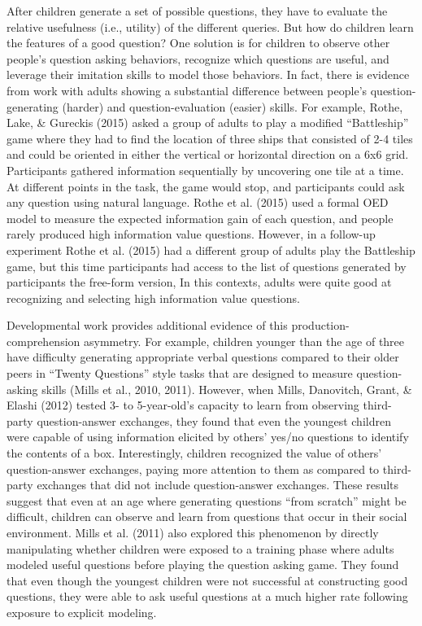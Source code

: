 \documentclass[oneside]{report}
\begin{document}
After children generate a set of possible questions, they have to
evaluate the relative usefulness (i.e., utility) of the different
queries. But how do children learn the features of a good question? One
solution is for children to observe other people's question asking
behaviors, recognize which questions are useful, and leverage their
imitation skills to model those behaviors. In fact, there is evidence
from work with adults showing a substantial difference between people's
question-generating (harder) and question-evaluation (easier) skills.
For example, Rothe, Lake, \& Gureckis (2015) asked a group of adults to
play a modified ``Battleship'' game where they had to find the location
of three ships that consisted of 2-4 tiles and could be oriented in
either the vertical or horizontal direction on a 6x6 grid. Participants
gathered information sequentially by uncovering one tile at a time. At
different points in the task, the game would stop, and participants
could ask any question using natural language. Rothe et al. (2015) used
a formal OED model to measure the expected information gain of each
question, and people rarely produced high information value questions.
However, in a follow-up experiment Rothe et al. (2015) had a different
group of adults play the Battleship game, but this time participants had
access to the list of questions generated by participants the free-form
version, In this contexts, adults were quite good at recognizing and
selecting high information value questions.

Developmental work provides additional evidence of this
production-comprehension asymmetry. For example, children younger than
the age of three have difficulty generating appropriate verbal questions
compared to their older peers in ``Twenty Questions'' style tasks that
are designed to measure question-asking skills (Mills et al., 2010,
2011). However, when Mills, Danovitch, Grant, \& Elashi (2012) tested 3-
to 5-year-old's capacity to learn from observing third-party
question-answer exchanges, they found that even the youngest children
were capable of using information elicited by others' yes/no questions
to identify the contents of a box. Interestingly, children recognized
the value of others' question-answer exchanges, paying more attention to
them as compared to third-party exchanges that did not include
question-answer exchanges. These results suggest that even at an age
where generating questions ``from scratch'' might be difficult, children
can observe and learn from questions that occur in their social
environment. Mills et al. (2011) also explored this phenomenon by
directly manipulating whether children were exposed to a training phase
where adults modeled useful questions before playing the question asking
game. They found that even though the youngest children were not
successful at constructing good questions, they were able to ask useful
questions at a much higher rate following exposure to explicit modeling.
\end{document}
